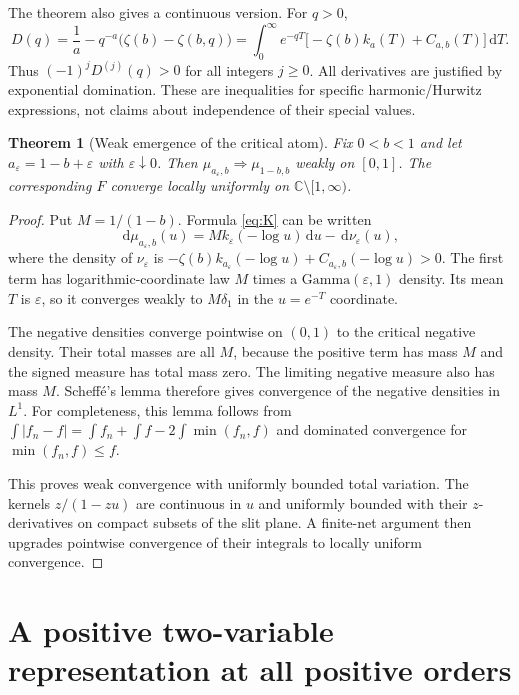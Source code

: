 \documentclass[11pt]{article}
\numberwithin{equation}{section}
\newtheorem{theorem}{Theorem}[section]
\theoremstyle{definition}\newtheorem{definition}[theorem]{Definition}
\theoremstyle{remark}\newtheorem{remark}[theorem]{Remark}
\newcommand{\dd}{\,\mathrm d}
\newcommand{\C}{\mathbb C}
\newcommand{\cut}{\C\setminus[1,\infty)}
\begin{document}
The theorem also gives a continuous version. For $q>0$,
\begin{equation}\label{eq:continuousdefect}
 D(q)=\frac1a-q^{-a}\bigl(\zeta(b)-\zeta(b,q)\bigr)
 =\int_0^\infty e^{-qT}
   \bigl[-\zeta(b)k_a(T)+C_{a,b}(T)\bigr]\dd T.
\end{equation}
Thus $(-1)^jD^{(j)}(q)>0$ for all integers $j\ge0$.
All derivatives are justified by exponential domination. These are
inequalities for specific harmonic/Hurwitz expressions, not claims
about independence of their special values.

\begin{theorem}[Weak emergence of the critical atom]\label{thm:weak}
Fix $0<b<1$ and let $a_\varepsilon=1-b+\varepsilon$ with
$\varepsilon\downarrow0$. Then
$\mu_{a_\varepsilon,b}\Rightarrow\mu_{1-b,b}$ weakly on $[0,1]$.
The corresponding $F$ converge locally uniformly on $\cut$.
\end{theorem}
\begin{proof}
Put $M=1/(1-b)$. Formula \eqref{eq:K} can be written
\[
 \dd\mu_{a_\varepsilon,b}(u)
 =M k_\varepsilon(-\log u)\dd u-\dd\nu_\varepsilon(u),
\]
where the density of $\nu_\varepsilon$ is
$-\zeta(b)k_{a_\varepsilon}(-\log u)+C_{a_\varepsilon,b}(-\log u)>0$.
The first term has logarithmic-coordinate law $M$ times a
$\mathrm{Gamma}(\varepsilon,1)$ density. Its mean $T$ is
$\varepsilon$, so it converges weakly to $M\delta_1$ in the
$u=e^{-T}$ coordinate.

The negative densities converge pointwise on $(0,1)$ to the critical
negative density. Their total masses are all $M$, because the positive
term has mass $M$ and the signed measure has total mass zero. The
limiting negative measure also has mass $M$. Scheff\'e's lemma
therefore gives convergence of the negative densities in $L^1$.
For completeness, this lemma follows from
$\int|f_n-f|=\int f_n+\int f-2\int\min(f_n,f)$ and dominated
convergence for $\min(f_n,f)\le f$.

This proves weak convergence with uniformly bounded total variation.
The kernels $z/(1-zu)$ are continuous in $u$ and uniformly bounded
with their $z$-derivatives on compact subsets of the slit plane.
A finite-net argument then upgrades pointwise convergence of their
integrals to locally uniform convergence.
\end{proof}

\section{A positive two-variable representation at all positive orders}
\label{sec:double}
\end{document}
